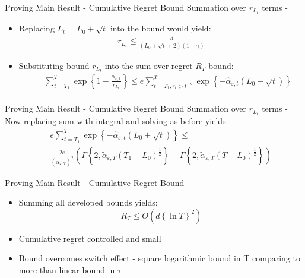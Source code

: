 \documentclass{beamer}
\begin{document}
\begin{frame}{Proving Main Result - Cumulative Regret Bound}
Summation over $r_{L_t}$ terms - \newline\newline
\begin{itemize}
\item Replacing $L_t=L_0+\sqrt{t}$ into the bound would yield:
\begin{eqnarray}
r_{L_t}\leq\frac{d}{\left(L_0+\sqrt{t}+2\right)\left(1-\gamma\right)}
\end{eqnarray}
\item Substituting bound $r_{L_t}$ into the sum over regret $R_T$ bound: 
\begin{eqnarray*}
&&\sum\limits_{t=T_1}^{T}\exp\left\{1-\frac{\alpha_{\varepsilon,t}}{r_{L_t}}\right\}\leq e\sum\limits_{t=T_1,r_t> t^{-\kappa}}^{T}\exp\left\{-\hat{\alpha}_{\varepsilon,t}\left(L_0+\sqrt{t}\right)\right\}\nonumber\\
\end{eqnarray*}
\end{itemize}
\end{frame}



\begin{frame}{Proving Main Result - Cumulative Regret Bound}
Summation over $r_{L_t}$ terms - \newline\newline
Now replacing sum with integral and solving as before yields:
\begin{eqnarray*}
&&e\sum\limits_{t=T_1}^{T}\exp\left\{-\hat{\alpha}_{\varepsilon,t}\left(L_0+\sqrt{t}\right)\right\}\leq\\
&&\frac{2e}{\left(\tilde{\alpha}_{\varepsilon,T}\right)^{2}}\left(\Gamma\left\{2,\tilde{\alpha}_{\varepsilon,T}\left(T_{1}-L_0\right)^{\frac{1}{2}}\right\}-\Gamma\left\{2,\tilde{\alpha}_{\varepsilon,T}\left(T-L_0\right)^{\frac{1}{2}}\right\}\right)\nonumber
\end{eqnarray*}
\end{frame}


\begin{frame}{Proving Main Result - Cumulative Regret Bound}
\begin{itemize}
\item Summing all developed bounds yields:
\begin{equation}
 R_T\leq O\left(d\left\{\ln{T}\right\}^2\right)
\end{equation}
\item Cumulative regret controlled and small\newline
\item Bound overcomes switch effect - square logarithmic bound in T comparing to more than linear bound in $\tau$
\end{itemize}

\end{frame}
\end{document}
